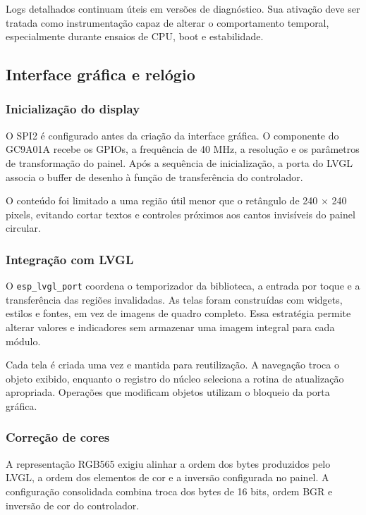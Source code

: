 \documentclass[a4paper,12pt]{article}
\begin{document}
Logs detalhados continuam \'uteis em vers\~oes de diagn\'ostico. Sua ativa\c{c}\~ao deve ser tratada como instrumenta\c{c}\~ao capaz de alterar o comportamento temporal, especialmente durante ensaios de CPU, boot e estabilidade.


\subsection{Interface gr\'afica e rel\'ogio}


\subsubsection{Inicializa\c{c}\~ao do display}


O SPI2 \'e configurado antes da cria\c{c}\~ao da interface gr\'afica. O componente do GC9A01A recebe os GPIOs, a frequ\^encia de 40 MHz, a resolu\c{c}\~ao e os par\^ametros de transforma\c{c}\~ao do painel. Ap\'os a sequ\^encia de inicializa\c{c}\~ao, a porta do LVGL associa o buffer de desenho \`a fun\c{c}\~ao de transfer\^encia do controlador.


O conte\'udo foi limitado a uma regi\~ao \'util menor que o ret\^angulo de 240 $\times$ 240 pixels, evitando cortar textos e controles pr\'oximos aos cantos invis\'iveis do painel circular.


\subsubsection{Integra\c{c}\~ao com LVGL}


O \texttt{esp\_lvgl\_port} coordena o temporizador da biblioteca, a entrada por toque e a transfer\^encia das regi\~oes invalidadas. As telas foram constru\'idas com widgets, estilos e fontes, em vez de imagens de quadro completo. Essa estrat\'egia permite alterar valores e indicadores sem armazenar uma imagem integral para cada m\'odulo.


Cada tela \'e criada uma vez e mantida para reutiliza\c{c}\~ao. A navega\c{c}\~ao troca o objeto exibido, enquanto o registro do n\'ucleo seleciona a rotina de atualiza\c{c}\~ao apropriada. Opera\c{c}\~oes que modificam objetos utilizam o bloqueio da porta gr\'afica.


\subsubsection{Corre\c{c}\~ao de cores}


A representa\c{c}\~ao RGB565 exigiu alinhar a ordem dos bytes produzidos pelo LVGL, a ordem dos elementos de cor e a invers\~ao configurada no painel. A configura\c{c}\~ao consolidada combina troca dos bytes de 16 bits, ordem BGR e invers\~ao de cor do controlador.
\end{document}
